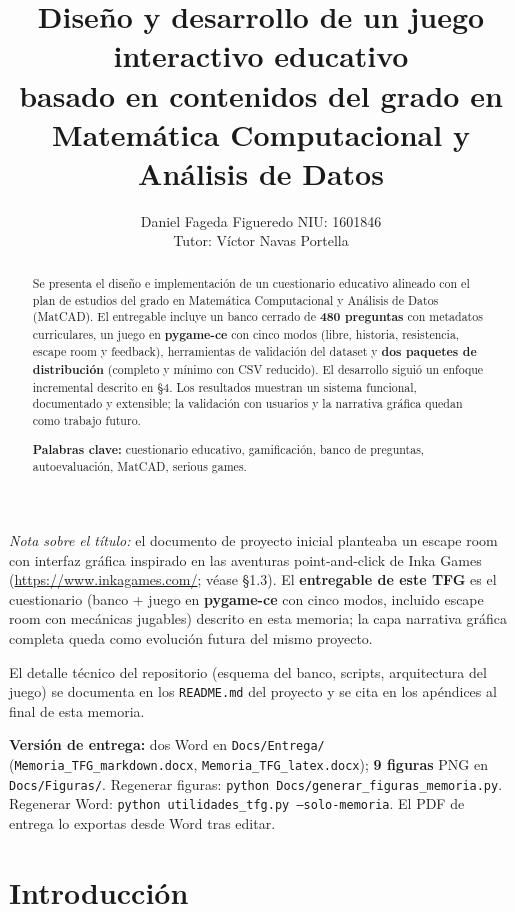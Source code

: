 \documentclass[11pt,a4paper]{article}
\title{Diseño y desarrollo de un juego interactivo educativo\\basado en contenidos del grado en Matemática Computacional y Análisis de Datos}
\author{%
  Daniel Fageda Figueredo \quad NIU: 1601846\\
  Tutor: Víctor Navas Portella
}
\date{}
\begin{document}
\maketitle

\begin{abstract}
\noindent Se presenta el diseño e implementación de un cuestionario educativo alineado con el plan de estudios del grado en Matemática Computacional y Análisis de Datos (MatCAD). El entregable incluye un banco cerrado de \textbf{480 preguntas} con metadatos curriculares, un juego en \textbf{pygame-ce} con cinco modos (libre, historia, resistencia, escape room y feedback), herramientas de validación del dataset y \textbf{dos paquetes de distribución} (completo y mínimo con CSV reducido). El desarrollo siguió un enfoque incremental descrito en §4. Los resultados muestran un sistema funcional, documentado y extensible; la validación con usuarios y la narrativa gráfica quedan como trabajo futuro.

\medskip
\noindent\textbf{Palabras clave:} cuestionario educativo, gamificación, banco de preguntas, autoevaluación, MatCAD, serious games.
\end{abstract}

\noindent\textit{Nota sobre el título:} el documento de proyecto inicial planteaba un escape room con interfaz gráfica inspirado en las aventuras point-and-click de Inka Games (\url{https://www.inkagames.com/}; véase §1.3). El \textbf{entregable de este TFG} es el cuestionario (banco + juego en \textbf{pygame-ce} con cinco modos, incluido escape room con mecánicas jugables) descrito en esta memoria; la capa narrativa gráfica completa queda como evolución futura del mismo proyecto.

\smallskip
\noindent El detalle técnico del repositorio (esquema del banco, scripts, arquitectura del juego) se documenta en los \texttt{README.md} del proyecto y se cita en los apéndices al final de esta memoria.

\smallskip
\noindent\textbf{Versión de entrega:} dos Word en \texttt{Docs/Entrega/} (\texttt{Memoria\_TFG\_markdown.docx}, \texttt{Memoria\_TFG\_latex.docx}); \textbf{9 figuras} PNG en \texttt{Docs/Figuras/}. Regenerar figuras: \texttt{python Docs/generar\_figuras\_memoria.py}. Regenerar Word: \texttt{python utilidades\_tfg.py --solo-memoria}. El PDF de entrega lo exportas desde Word tras editar.

\newpage
\tableofcontents
\newpage

\section{Introducción}
\end{document}
